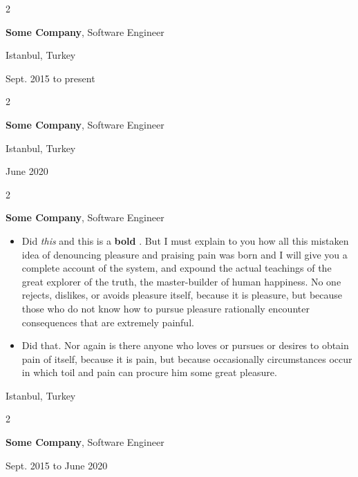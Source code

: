 \documentclass[10pt, letterpaper]{article}
\newenvironment{highlights}{
    \begin{itemize}[
        topsep=0.10 cm,
        parsep=0.10 cm,
        partopsep=0pt,
        itemsep=0pt,
        leftmargin=0.4 cm + 10pt
    ]
}{
    \end{itemize}
} %
\newenvironment{twocolentry}[2][]{
    \onecolentry
    \def\secondColumn{#2}
    \setcolumnwidth{\fill, 4.5 cm}
    \begin{paracol}{2}
}{
    \switchcolumn \raggedleft \secondColumn
    \end{paracol}
    \endonecolentry
} %
\let\hrefWithoutArrow\href
\renewcommand{\href}[2]{\hrefWithoutArrow{#1}{\mbox{\ifthenelse{\equal{#2}{}}{ }{#2 }\raisebox{.15ex}{\footnotesize \faExternalLink*}}}}
\begin{document}
        \vspace{0.2 cm}

        \begin{twocolentry}{
            Istanbul, Turkey

        Sept. 2015 to present
        }
            \textbf{Some \textnormal{Company}}, Software Engineer
        \end{twocolentry}


        \vspace{0.2 cm}

        \begin{twocolentry}{
            Istanbul, Turkey

        June 2020
        }
            \textbf{Some \textnormal{Company}}, Software Engineer
        \end{twocolentry}


        \vspace{0.2 cm}

        \begin{twocolentry}{
            Istanbul, Turkey
        }
            \textbf{Some \textnormal{Company}}, Software Engineer
            \begin{highlights}
                \item Did \textit{this} and this is a \textbf{bold} \href{https://example.com}{link}. But I must explain to you how all this mistaken idea of denouncing pleasure and praising pain was born and I will give you a complete account of the system, and expound the actual teachings of the great explorer of the truth, the master-builder of human happiness. No one rejects, dislikes, or avoids pleasure itself, because it is pleasure, but because those who do not know how to pursue pleasure rationally encounter consequences that are extremely painful.
                \item Did that. Nor again is there anyone who loves or pursues or desires to obtain pain of itself, because it is pain, but because occasionally circumstances occur in which toil and pain can procure him some great pleasure.
            \end{highlights}
        \end{twocolentry}


        \vspace{0.2 cm}

        \begin{twocolentry}{
            Sept. 2015 to June 2020
        }
            \textbf{Some \textnormal{Company}}, Software Engineer
        \end{twocolentry}
\end{document}
